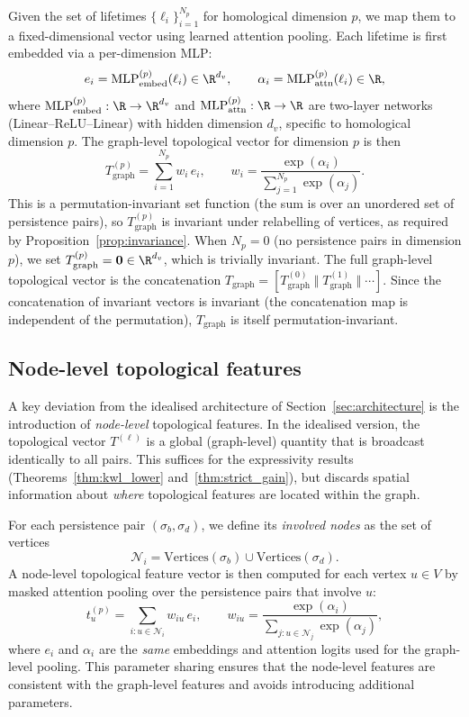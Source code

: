 Given the set of lifetimes $\{\ell_i\}_{i=1}^{N_p}$ for homological dimension $p$, we map them to a fixed-dimensional vector using learned attention pooling. Each lifetime is first embedded via a per-dimension MLP:
\[
    e_i = \mathrm{MLP}^{(p)}_{\mathrm{embed}}(\ell_i) \in \R^{d_v}, \qquad
    \alpha_i = \mathrm{MLP}^{(p)}_{\mathrm{attn}}(\ell_i) \in \R,
\]
where $\mathrm{MLP}^{(p)}_{\mathrm{embed}}: \R \to \R^{d_v}$ and $\mathrm{MLP}^{(p)}_{\mathrm{attn}}: \R \to \R$ are two-layer networks (Linear--ReLU--Linear) with hidden dimension $d_v$, specific to homological dimension $p$. The graph-level topological vector for dimension $p$ is then
\[
    T^{(p)}_{\mathrm{graph}} = \sum_{i=1}^{N_p} w_i \, e_i, \qquad
    w_i = \frac{\exp(\alpha_i)}{\sum_{j=1}^{N_p} \exp(\alpha_j)}.
\]
This is a permutation-invariant set function (the sum is over an unordered set of persistence pairs), so $T^{(p)}_{\mathrm{graph}}$ is invariant under relabelling of vertices, as required by Proposition~\ref{prop:invariance}. When $N_p = 0$ (no persistence pairs in dimension $p$), we set $T^{(p)}_{\mathrm{graph}} = \mathbf{0} \in \R^{d_v}$, which is trivially invariant. The full graph-level topological vector is the concatenation $T_{\mathrm{graph}} = [T^{(0)}_{\mathrm{graph}} \;\Vert\; T^{(1)}_{\mathrm{graph}} \;\Vert\; \cdots]$. Since the concatenation of invariant vectors is invariant (the concatenation map is independent of the permutation), $T_{\mathrm{graph}}$ is itself permutation-invariant.


\subsection{Node-level topological features}
\label{sec:node_features}

A key deviation from the idealised architecture of Section~\ref{sec:architecture} is the introduction of \emph{node-level} topological features. In the idealised version, the topological vector $T^{(\ell)}$ is a global (graph-level) quantity that is broadcast identically to all pairs. This suffices for the expressivity results (Theorems~\ref{thm:kwl_lower} and~\ref{thm:strict_gain}), but discards spatial information about \emph{where} topological features are located within the graph.

For each persistence pair $(\sigma_b, \sigma_d)$, we define its \emph{involved nodes} as the set of vertices
\[
    \mathcal{N}_i = \mathrm{Vertices}(\sigma_b) \cup \mathrm{Vertices}(\sigma_d).
\]
A node-level topological feature vector is then computed for each vertex $u \in V$ by masked attention pooling over the persistence pairs that involve $u$:
\[
    t_u^{(p)} = \sum_{i : u \in \mathcal{N}_i} w_{iu}\, e_i, \qquad
    w_{iu} = \frac{\exp(\alpha_i)}{\sum_{j : u \in \mathcal{N}_j} \exp(\alpha_j)},
\]
where $e_i$ and $\alpha_i$ are the \emph{same} embeddings and attention logits used for the graph-level pooling. This parameter sharing ensures that the node-level features are consistent with the graph-level features and avoids introducing additional parameters.

